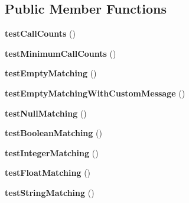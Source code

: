 \subsection*{Public Member Functions}
\begin{DoxyCompactItemize}
\item 
\hypertarget{class_test_of_mock_objects_output_a618a2ef8c8f94f397de16ebf2955b3bc}{
{\bfseries testCallCounts} ()}
\label{class_test_of_mock_objects_output_a618a2ef8c8f94f397de16ebf2955b3bc}

\item 
\hypertarget{class_test_of_mock_objects_output_af6e2d49153f86bb5b43d049fd194f046}{
{\bfseries testMinimumCallCounts} ()}
\label{class_test_of_mock_objects_output_af6e2d49153f86bb5b43d049fd194f046}

\item 
\hypertarget{class_test_of_mock_objects_output_acf5ac9945b0f116a76d66877552b0b07}{
{\bfseries testEmptyMatching} ()}
\label{class_test_of_mock_objects_output_acf5ac9945b0f116a76d66877552b0b07}

\item 
\hypertarget{class_test_of_mock_objects_output_a3c793a197a7b4d5db0a23e5b468912ea}{
{\bfseries testEmptyMatchingWithCustomMessage} ()}
\label{class_test_of_mock_objects_output_a3c793a197a7b4d5db0a23e5b468912ea}

\item 
\hypertarget{class_test_of_mock_objects_output_af23026b91b3610444b855e10bf7f6afa}{
{\bfseries testNullMatching} ()}
\label{class_test_of_mock_objects_output_af23026b91b3610444b855e10bf7f6afa}

\item 
\hypertarget{class_test_of_mock_objects_output_a32f0cd2d0cceb26d19d758d9c973bf02}{
{\bfseries testBooleanMatching} ()}
\label{class_test_of_mock_objects_output_a32f0cd2d0cceb26d19d758d9c973bf02}

\item 
\hypertarget{class_test_of_mock_objects_output_ae9613a6a142ee348586f0ebe63abe7f0}{
{\bfseries testIntegerMatching} ()}
\label{class_test_of_mock_objects_output_ae9613a6a142ee348586f0ebe63abe7f0}

\item 
\hypertarget{class_test_of_mock_objects_output_a7a7f29c62755ad24e346fa0f512a47c8}{
{\bfseries testFloatMatching} ()}
\label{class_test_of_mock_objects_output_a7a7f29c62755ad24e346fa0f512a47c8}

\item 
\hypertarget{class_test_of_mock_objects_output_a712e350d10d96a87e58ad0631fc4a68b}{
{\bfseries testStringMatching} ()}
\label{class_test_of_mock_objects_output_a712e350d10d96a87e58ad0631fc4a68b}


\end{DoxyCompactItemize}
